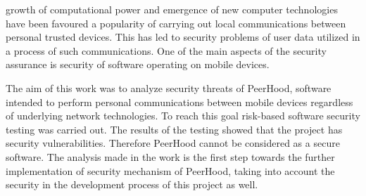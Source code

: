 %
 growth of computational power and emergence of new computer technologies have been favoured a popularity of carrying out local communications between personal trusted devices. 
%
This has led to security problems of user data utilized in a process of such communications. 
%
One of the main aspects of the security assurance is security of software operating on mobile devices. 

%
The aim of this work was to analyze security threats of PeerHood, software intended to perform personal communications between mobile devices regardless of underlying network technologies. 
%
To reach this goal risk-based software security testing was carried out. 
%
The results of the testing showed that the project has security vulnerabilities. 
%
Therefore PeerHood cannot be considered as a secure software. 
%
The analysis made in the work is the first step towards the further implementation of security mechanism of PeerHood, taking into account the security in the development process of this project as well. 